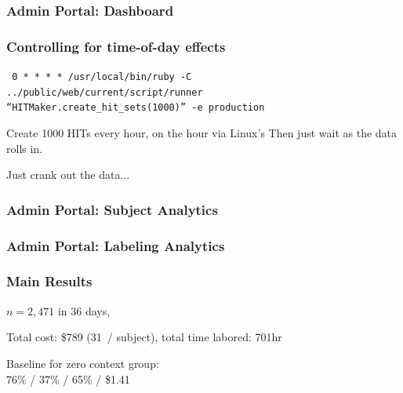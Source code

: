 \documentclass[slides]{beamer} %
\begin{document}
\begin{frame}\frametitle{Admin Portal: Dashboard}


\end{frame}

\begin{frame}\frametitle{Controlling for time-of-day effects}

\begin{center}
\texttt{
0 * * * * /usr/local/bin/ruby -C \\
../public/web/current/script/runner \\
``HITMaker.create\_hit\_sets(1000)'' -e production}
\end{center}

\vspace{0.5cm}

Create 1000 HITs every hour, on the hour via Linux's  Then just wait as the data rolls in. \pause


Just crank out the data...

\end{frame}

\begin{frame}\frametitle{Admin Portal: Subject Analytics}


\end{frame}

\begin{frame}\frametitle{Admin Portal: Labeling Analytics}


\end{frame}

\begin{frame}\frametitle{Main Results}

$n=2,471$ \pause in 36 days,  \\ \pause

Total cost: \$789  \pause (31\cent ~/ subject),  \pause total time labored: 701hr \pause


\centering
Baseline for zero context group: \\
76\% / 37\% / 65\% / \$1.41

\end{frame}
\end{document}
